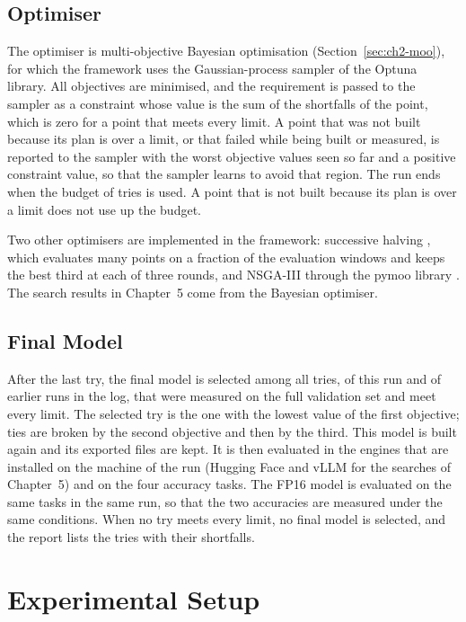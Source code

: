 \subsection{Optimiser}
\label{sec:ch4-optimiser}

The optimiser is multi-objective Bayesian optimisation (Section~\ref{sec:ch2-moo}), for which the framework uses the Gaussian-process sampler of the Optuna library. All objectives are minimised, and the requirement is passed to the sampler as a constraint whose value is the sum of the shortfalls of the point, which is zero for a point that meets every limit. A point that was not built because its plan is over a limit, or that failed while being built or measured, is reported to the sampler with the worst objective values seen so far and a positive constraint value, so that the sampler learns to avoid that region. The run ends when the budget of tries is used. A point that is not built because its plan is over a limit does not use up the budget.

Two other optimisers are implemented in the framework: successive halving \cite{bischl2021hpo}, which evaluates many points on a fraction of the evaluation windows and keeps the best third at each of three rounds, and NSGA-III through the pymoo library \cite{blank2020pymoo}. The search results in Chapter~5 come from the Bayesian optimiser.

\subsection{Final Model}
\label{sec:ch4-final}

After the last try, the final model is selected among all tries, of this run and of earlier runs in the log, that were measured on the full validation set and meet every limit. The selected try is the one with the lowest value of the first objective; ties are broken by the second objective and then by the third. This model is built again and its exported files are kept. It is then evaluated in the engines that are installed on the machine of the run (Hugging Face and vLLM for the searches of Chapter~5) and on the four accuracy tasks. The FP16 model is evaluated on the same tasks in the same run, so that the two accuracies are measured under the same conditions. When no try meets every limit, no final model is selected, and the report lists the tries with their shortfalls.

\section{Experimental Setup}
\label{sec:ch4-setup}

